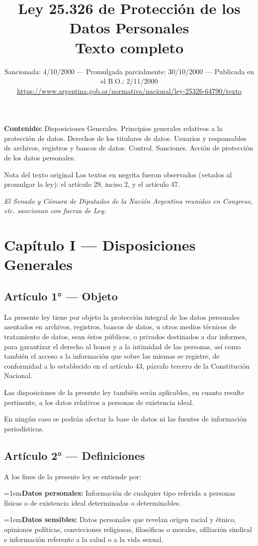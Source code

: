 \documentclass[10pt,a4paper]{article}
\title{\vspace{-1.5cm}\textbf{Ley 25.326 de Protección de los Datos Personales}\\[3pt]
  \large Texto completo}
\author{\normalsize Sancionada: 4/10/2000 --- Promulgada parcialmente: 30/10/2000 --- Publicada en el B.O.: 2/11/2000\\[2pt]
  \small\url{https://www.argentina.gob.ar/normativa/nacional/ley-25326-64790/texto}}
\date{}
\newcommand{\articulo}[1]{\subsection{#1}}
\newcommand{\definicion}[2]{\par{\hangindent=1em\hangafter=1\makebox[1em][l]{--}\textbf{#1:} #2\par}}
\begin{document}
\maketitle

\textbf{Contenido:} Disposiciones Generales. Principios generales relativos a la protección de datos. Derechos de los titulares de datos. Usuarios y responsables de archivos, registros y bancos de datos. Control. Sanciones. Acción de protección de los datos personales.

\begin{aviso}{Nota del texto original}
Los textos en negrita fueron observados (vetados al promulgar la ley): el artículo 29, inciso 2, y el artículo 47.
\end{aviso}

{\small\indice}
\clearpage

\begin{center}\itshape El Senado y Cámara de Diputados de la Nación Argentina reunidos en Congreso, etc. sancionan con fuerza de Ley:\end{center}
\section{Capítulo I --- Disposiciones Generales}
\articulo{Artículo 1° --- Objeto}
La presente ley tiene por objeto la protección integral de los datos personales asentados en archivos, registros, bancos de datos, u otros medios técnicos de tratamiento de datos, sean éstos públicos, o privados destinados a dar informes, para garantizar el derecho al honor y a la intimidad de las personas, así como también el acceso a la información que sobre las mismas se registre, de conformidad a lo establecido en el artículo 43, párrafo tercero de la Constitución Nacional.

Las disposiciones de la presente ley también serán aplicables, en cuanto resulte pertinente, a los datos relativos a personas de existencia ideal.

En ningún caso se podrán afectar la base de datos ni las fuentes de información periodísticas.

\articulo{Artículo 2° --- Definiciones}
A los fines de la presente ley se entiende por:

\definicion{Datos personales}{Información de cualquier tipo referida a personas físicas o de existencia ideal determinadas o determinables.}

\definicion{Datos sensibles}{Datos personales que revelan origen racial y étnico, opiniones políticas, convicciones religiosas, filosóficas o morales, afiliación sindical e información referente a la salud o a la vida sexual.}
\end{document}
